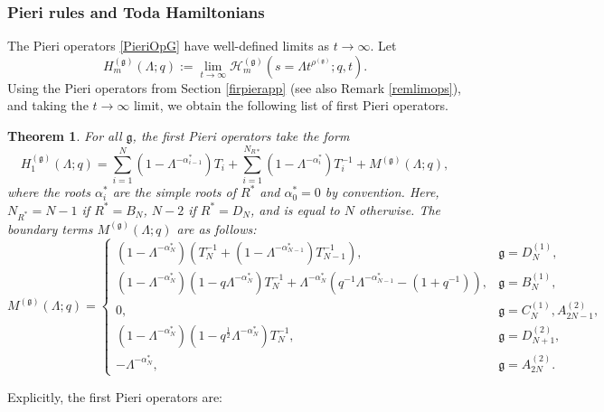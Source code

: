 \documentclass[12pt]{amsart}
\newtheorem{thm}{Theorem}[section]
\newcommand{\g}{{\mathfrak{g}}}
\newcommand{\cH}{{\mathcal{H}}}
\newcommand{\al}{{\alpha}}
\newcommand{\lL}{{\Lambda}}
\numberwithin{equation}{section}
\begin{document}
\subsubsection{Pieri rules and Toda Hamiltonians}\label{TodaHamil}



The Pieri operators \eqref{PieriOpG} have well-defined limits as $t\to\infty$. Let
\begin{equation}\label{pierilimq}
H_m^{(\g)}(\lL;q):=\lim_{t\to \infty} \cH_m^{(\g)}(s=\lL t^{\rho^{(\g)}};q,t) .
\end{equation}
%
%
%
%
%
%
Using the Pieri operators from Section \ref{firpierapp} (see also Remark \ref{remlimops}), and taking the $t\to\infty$ limit, we obtain the following list of first Pieri operators.
\begin{thm}\label{hamilist}
For all $\g$, the first Pieri operators take the form
\begin{equation}
H_1^{(\g)}(\Lambda;q) = \sum_{i=1}^N(1- \Lambda^{-\alpha_{i-1}^*})T_i + \sum_{i=1}^{N_{R*}} (1-\Lambda^{-\alpha_i^*})T_i^{-1} + M^{(\g)}(\Lambda;q), \label{Hamil}
\end{equation}
%
%
%
where the roots $\al_i^*$ are the simple roots of $R^*$
and $\al_0^*=0$ by convention. 
Here, $N_{R^*}=N-1$ if $R^*=B_N$, $N-2$ if $R^*=D_N$, and is equal to $N$ otherwise.
The boundary terms  $M^{(\g)}(\Lambda;q)$ are as follows:
\begin{equation}
\renewcommand{\arraystretch}{1.5}
M^{(\g)} (\Lambda;q)= \left\{ \begin{array}{ll}
(1-\Lambda^{-\alpha_{N}^*})(T_{N}^{-1} + (1-\Lambda^{-\alpha_{N-1}^*})T_{N-1}^{-1}),& \g=D_N^{(1)},\\ 
(1-\Lambda^{-\alpha_N^*})(1-q\Lambda^{-\alpha_N^*})T_N^{-1} + \Lambda^{-\alpha_N^*}(q^{-1}\Lambda^{-\alpha_{N-1}^*} - (1+q^{-1})),&\g=B_N^{(1)},\\ 
0,& \g=C_N^{(1)}, A_{2N-1}^{(2)},\\ 
(1-\Lambda^{-\alpha_{N}^*})(1-q^{\frac12}\Lambda^{-\alpha_{N}^*})T_N^{-1},& \g=D_{N+1}^{(2)},\\ 
-\Lambda^{-\alpha_N^*}, & \g=A_{2N}^{(2)}.
\end{array}\right.\label{Hamil2}
\end{equation}
\end{thm}
%
Explicitly, the first Pieri operators are:
\end{document}
